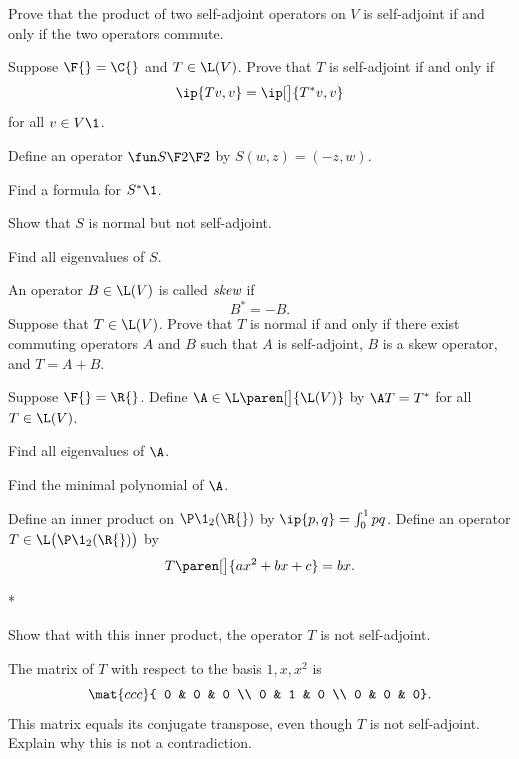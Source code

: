 \exercise
Prove that the product of two self-adjoint operators on $V$ is self-adjoint if and only if the two operators commute.


\exercise
Suppose $\F{} = \C{}$ and $T \in \L(V)$. Prove that $T$ is self-adjoint if and only if
\[
\ip{Tv, v} = \ip[\big]{T^*v, v}
\]
for all $v \in V\1$.


\pagebreak[3]

\exercise
Define an operator $\fun S {\F 2} {\F 2}$ by $S(w, z) = (-z, w)$.
\begin{subtheorem}
\item
Find a formula for $S^*\1$.
\item
Show that $S$ is normal but not self-adjoint.
\item
Find all eigenvalues of $S$.
\end{subtheorem}


\exercise
An operator $B \in \L(V)$ is called $\emph{skew}$ if
\[
B^* = -B.
\]
Suppose that \mbox{$T \in \L(V)$}. Prove that $T$ is normal if and only if there exist commuting operators $A$ and $B$ such that $A$ is self-adjoint, $B$ is a skew operator, and $T = A + B$. \label{skewadj} 


\exercise
Suppose $\F{} = \R{}$. Define $\A \in \L\paren[\big]{\L(V)}$ by $\A T = T^*$ for all $T \in \L(V)$.
\begin{subtheorem}
\item
Find all eigenvalues of $\A$.
\item
Find the minimal polynomial of $\A$.
\end{subtheorem}
\exercisesubtheoremend


\exercise
Define an inner product on $\P\1_2(\R{})$ by
$
\ip{p,q} = \int_0^1 pq$.
Define an operator $T \in \L\bigl(\P\1_2(\R{})\bigr)$ by
\[
T\paren[\big]{a x^2 + bx + c} = b x.
\]
\begin{subtheorem}*
\item
Show that with this inner product, the operator $T$ is not self-adjoint.
\item
The matrix of $T$ with respect to the basis $1, x, x^2$ is
\[
\mat{ccc}{
0 & 0 & 0 \\
0 & 1 & 0 \\
0 & 0 & 0}.
\]
This matrix equals its conjugate transpose, even though $T$ is not self-adjoint.
Explain why this is not a contradiction.
\end{subtheorem}
\exercisesubtheoremend


